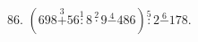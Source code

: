 86. $(698\stackrel{3}{+}56\stackrel{1}{:}8\stackrel{2}{\cdot}9\stackrel{4}{-}486)\stackrel{5}{:}2\stackrel{6}{-}178.$
